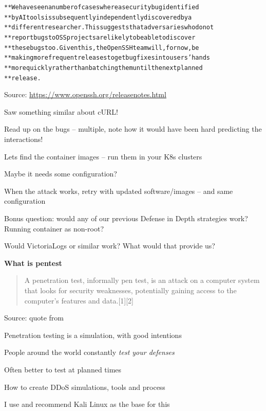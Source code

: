 \documentclass[Screen16to9,17pt]{foils}
\begin{document}

\begin{alltt}\small
** We have seen a number of cases where a security bug identified
** by AI tools is subsequently independently discovered by a
** different researcher. This suggests that adversaries who do not
** report bugs to OSS projects are likely to be able to discover
** these bugs too. Given this, the OpenSSH team will, for now, be
** making more frequent releases to get bugfixes into users' hands
** more quickly rather than batching them until the next planned
** release.
\end{alltt}
Source: \url{https://www.openssh.org/releasenotes.html}

Saw something similar about cURL!


\begin{list2}
\item Read up on the bugs -- multiple, note how it would have been hard predicting the interactions!
\item Lets find the container images -- run them in your K8s clusters
\item Maybe it needs some configuration?
\vskip 5mm
\item When the attack works, retry with updated software/images -- and same configuration
\end{list2}

Bonus question: would any of our previous Defense in Depth strategies work? Running container as non-root?

Would VictoriaLogs or similar work? What would that provide us?

\breakdance





{\bf What is pentest}

\begin{quote}
A penetration test, informally pen test, is an attack on a computer system that looks for security weaknesses, potentially gaining access to the computer's features and data.[1][2]
\end{quote}
Source: quote from 

\begin{list1}
\item Penetration testing is a simulation, with good intentions
\item People around the world constantly \emph{test your defenses}
\item Often better to test at planned times
\item How to create DDoS simulations, tools and process
\item I use and recommend Kali Linux as the base for this
\end{list1}
\end{document}
